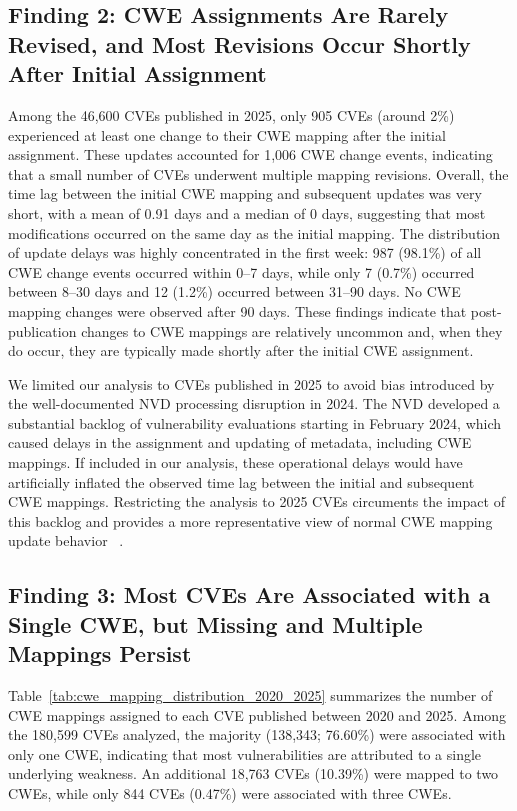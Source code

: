 \documentclass[conference,compsoc]{IEEEtran}
\begin{document}
\subsection{Finding 2: CWE Assignments Are Rarely Revised, and Most Revisions Occur Shortly After Initial Assignment}

Among the 46,600 CVEs published in 2025, only 905 CVEs (around 2\%) experienced at least one change to their CWE mapping after the initial assignment. These updates accounted for 1,006 CWE change events, indicating that a small number of CVEs underwent multiple mapping revisions. Overall, the time lag between the initial CWE mapping and subsequent updates was very short, with a mean of 0.91 days and a median of 0 days, suggesting that most modifications occurred on the same day as the initial mapping. The distribution of update delays was highly concentrated in the first week: 987 (98.1\%) of all CWE change events occurred within 0–7 days, while only 7 (0.7\%) occurred between 8–30 days and 12 (1.2\%) occurred between 31–90 days. No CWE mapping changes were observed after 90 days. These findings indicate that post-publication changes to CWE mappings are relatively uncommon and, when they do occur, they are typically made shortly after the initial CWE assignment.

We limited our analysis to CVEs published in 2025 to avoid bias introduced by the well-documented NVD processing disruption in 2024. The NVD developed a substantial backlog of vulnerability evaluations starting in February 2024, which caused delays in the assignment and updating of metadata, including CWE mappings. If included in our analysis, these operational delays would have artificially inflated the observed time lag between the initial and subsequent CWE mappings. Restricting the analysis to 2025 CVEs circuments the impact of this backlog and provides a more representative view of normal CWE mapping update behavior ~\cite{NVD2024Backlog,NIST2026NVD}.




\subsection{Finding 3: Most CVEs Are Associated with
a Single CWE, but Missing and Multiple Mappings Persist}

Table~\ref{tab:cwe_mapping_distribution_2020_2025} summarizes the number of CWE mappings assigned to each CVE published between 2020 and 2025. Among the 180,599 CVEs analyzed, the majority (138,343; 76.60\%) were associated with only one CWE, indicating that most vulnerabilities are attributed to a single underlying weakness. An additional 18,763 CVEs (10.39\%) were mapped to two CWEs, while only 844 CVEs (0.47\%) were associated with three CWEs.
\end{document}
